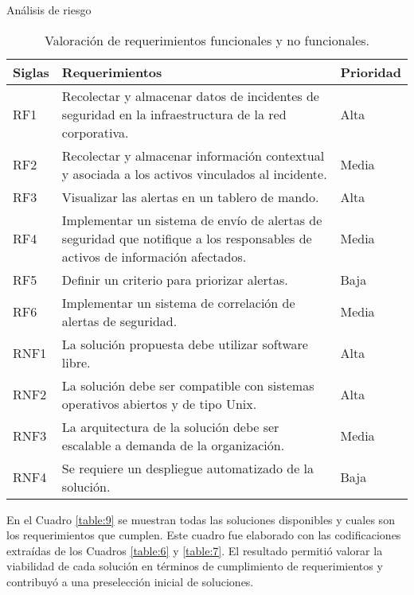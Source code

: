 \begin{section}{Análisis de riesgo}
\begin{table}[H]
\begin{tabular}{|m{3em}|m{28em}|m{4em}|}
            \hline 
                Siglas & Requerimientos & Prioridad \\ 
            \hline
                RF1 & Recolectar y almacenar datos de incidentes de seguridad en la infraestructura de la red corporativa. & Alta \\ 
            \hline
                RF2  & Recolectar y almacenar información contextual y asociada a los activos vinculados al incidente. & Media\\ 
            \hline
                RF3 & Visualizar las alertas en un tablero de mando. & Alta\\
            \hline
                RF4 & Implementar un sistema de envío de alertas de seguridad que notifique a los responsables de activos de información afectados. & Media \\
            \hline
                RF5 & Definir un criterio para priorizar alertas. & Baja\\
            \hline
                RF6 & Implementar un sistema de correlación de alertas de seguridad. & Media \\
            \hline
                RNF1 & La solución propuesta debe utilizar software libre. & Alta\\
            \hline
                RNF2 & La solución debe ser compatible con sistemas operativos abiertos y de tipo Unix. & Alta \\
            \hline
                RNF3 & La arquitectura de la solución debe ser escalable a demanda de la organización. & Media \\
            \hline
                RNF4 & Se requiere un despliegue automatizado de la solución. & Baja\\
            \hline %
        \end{tabular}
        \caption{Valoración de requerimientos funcionales y no funcionales.}
        \label{table:8}
    \end{table}
     \FloatBarrier
     En el Cuadro \ref{table:9} se muestran todas las soluciones disponibles y cuales son los requerimientos que cumplen. Este cuadro fue elaborado con las codificaciones extraídas de los Cuadros \ref{table:6} y \ref{table:7}. El resultado permitió valorar la viabilidad de cada solución en términos de cumplimiento de requerimientos y contribuyó a una preselección inicial de soluciones. 
     \begin{table}[H]
        \centering
        \begin{tabular}{|m{4em}|m{2em}|m{2em}|m{2em}|m{2em}|m{2em}|m{2em}|m{3em}|m{3em}|m{3em}|m{3em}|}
        

\end{tabular}
\end{table}
\end{section}
